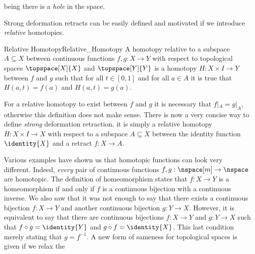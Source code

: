 \documentclass{book}                                                           %
\begin{document}
                being there is a \textit{hole} in the space.
                \par\hfill\par
                Strong deformation retracts can be easily defined and motivated
                if we introduce \textit{relative} homotopies.
                \begin{fdefinition}{Relative Homotopy}{Relative_Homotopy}
                    A homotopy relative to a subspace $A\subseteq{X}$ between
                    continuous functions $f,g:X\rightarrow{Y}$ with respect to
                    topological spaces $\topspace[X]{X}$ and $\topspace[Y]{Y}$
                    is a homotopy $H:X\times{I}\rightarrow{Y}$ between $f$ and
                    $g$ such that for all $t\in[0,1]$ and for all $a\in{A}$ it
                    is true that $H(a,t)=f(a)$ and $H(a,t)=g(a)$.
                \end{fdefinition}
                For a relative homotopy to exist between $f$ and $g$ it is
                necessary that $f|_{A}=g|_{A}$, otherwise this definition does
                not make sense. There is now a very concise way to define
                \textit{strong} deformation retraction, it is simply a relative
                homotopy $H:X\times{I}\rightarrow{X}$ with respect to a subspace
                $A\subseteq{X}$ between the identity function $\identity{X}$ and
                a retract $f:X\rightarrow{A}$.
                \par\hfill\par
                Various examples have shown us that homotopic functions can look
                very different. Indeed, \textit{every} pair of continuous
                functions $f,g:\nspace[m]\rightarrow\nspace$ are homotopic. The
                definition of homeomorphism states that $f:X\rightarrow{Y}$ is
                a homeomorphism if and only if $f$ is a continuous bijection
                with a continuous inverse. We also saw that it was not enough to
                say that there exists a continuous bijection $f:X\rightarrow{Y}$
                and another continuous bijection $g:Y\rightarrow{X}$. However,
                it is equivalent to say that there are continuous bijections
                $f:X\rightarrow{Y}$ and $g:Y\rightarrow{X}$ such that
                $f\circ{g}=\identity{Y}$ and $g\circ{f}=\identity{X}$. This last
                condition merely stating that $g=f^{\minus{1}}$. A new form of
                sameness for topological spaces is given if we relax the
\end{document}

